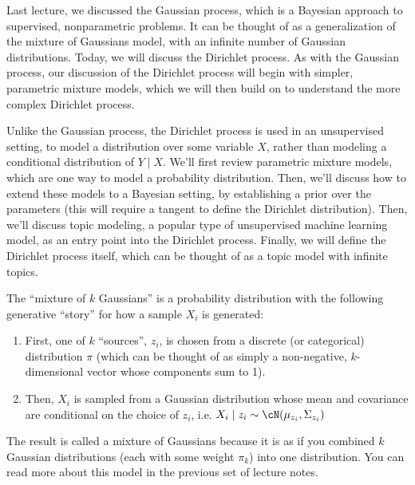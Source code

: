 
\setcounter{section}{0}


Last lecture, we discussed the Gaussian process, which is a Bayesian approach to supervised, nonparametric problems. It can be thought of as a generalization of the mixture of Gaussians model, with an infinite number of Gaussian distributions. Today, we will discuss the Dirichlet process. As with the Gaussian process, our discussion of the Dirichlet process will begin with simpler, parametric mixture models, which we will then build on to understand the more complex Dirichlet process.

Unlike the Gaussian process, the Dirichlet process is used in an unsupervised setting, to model a distribution over some variable $X$, rather than modeling a conditional distribution of $Y \mid X$. We'll first review parametric mixture models, which are one way to model a probability distribution. Then, we'll discuss how to extend these models to a Bayesian setting, by establishing a prior over the parameters (this will require a tangent to define the Dirichlet distribution). Then, we'll discuss topic modeling, a popular type of unsupervised machine learning model, as an entry point into the Dirichlet process. Finally, we will define the Dirichlet process itself, which can be thought of as a topic model with infinite topics.


The ``mixture of $k$ Gaussians'' is a probability distribution with the following generative ``story'' for how a sample $X_i$ is generated:
\begin{enumerate}
\item First, one of $k$ ``sources'', $z_i$, is chosen from a discrete (or categorical) distribution $\pi$ (which can be thought of as simply a non-negative, $k$-dimensional vector whose components sum to 1).
\item Then, $X_i$ is sampled from a Gaussian distribution whose mean and covariance are conditional on the choice of $z_i$, i.e. $X_i \mid z_i \sim \cN(\mu_{z_i}, \Sigma_{z_i})$
\end{enumerate}

The result is called a mixture of Gaussians because it is as if you combined $k$ Gaussian distributions (each with some weight $\pi_k$) into one distribution. You can read more about this model in the previous set of lecture notes.

